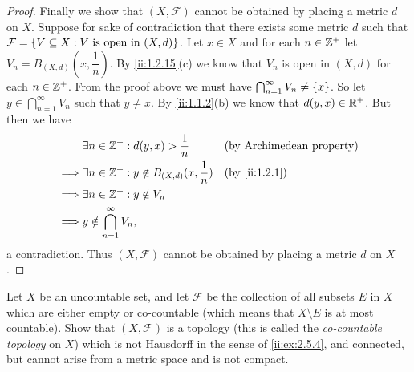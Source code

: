 \begin{proof}
  Finally we show that \((X, \mathcal{F})\) cannot be obtained by placing a metric \(d\) on \(X\).
  Suppose for sake of contradiction that there exists some metric \(d\) such that \(\mathcal{F} = \left\lbrace V \subseteq X : V \text{ is open in } (X, d)\right\rbrace\).
  Let \(x \in X\) and for each \(n \in \mathbb{Z}^+\) let \(V_n = B_{(X, d)}(x, \dfrac{1}{n})\).
  By \cref{ii:1.2.15}(c) we know that \(V_n\) is open in \((X, d)\) for each \(n \in \mathbb{Z}^+\).
  From the proof above we must have \(\bigcap_{n = 1}^\infty V_n \neq \left\lbrace x\right\rbrace\).
  So let \(y \in \bigcap_{n = 1}^\infty V_n\) such that \(y \neq x\).
  By \cref{ii:1.1.2}(b) we know that \(d(y, x) \in \mathbb{R}^+\).
  But then we have
  \begin{align*}
             & \exists n \in \Z^+ : d(y, x) > \dfrac{1}{n}               &  & \text{(by Archimedean property)} \\
    \implies & \exists n \in \Z^+ : y \notin B_{(X, d)}(x, \dfrac{1}{n}) &  & \by{ii:1.2.1}                    \\
    \implies & \exists n \in \Z^+ : y \notin V_n                                                               \\
    \implies & y \notin \bigcap_{n = 1}^\infty V_n,
  \end{align*}
  a contradiction.
  Thus \((X, \mathcal{F})\) cannot be obtained by placing a metric \(d\) on \(X\).
\end{proof}

\begin{ex}\label{ii:ex:2.5.7}
  Let \(X\) be an uncountable set, and let \(\mathcal{F}\) be the collection of all subsets \(E\) in \(X\) which are either empty or co-countable
  (which means that \(X \setminus E\) is at most countable).
  Show that \((X, \mathcal{F})\) is a topology (this is called the \emph{co-countable topology} on \(X\)) which is not Hausdorff in the sense of \cref{ii:ex:2.5.4}, and connected, but cannot arise from a metric space and is not compact.
\end{ex}

